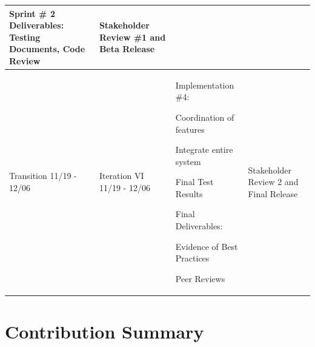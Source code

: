 \documentclass[11pt]{article}
\newenvironment{packed_itemize}{
\begin{itemize}
  \setlength{\itemsep}{1pt}
  \setlength{\parskip}{0pt}
  \setlength{\parsep}{0pt}
}{\end{itemize}}
\begin{document}
\begin{tabular}{|m{0.9in}|m{0.9in}|m{4in}|m{.8in}|}
Sprint \# 2 Deliverables:
 Testing Documents, Code Review &
Stakeholder Review \#1
and
Beta Release \\ \hline
Transition  11/19 - 12/06 &
Iteration VI 11/19 - 12/06 & \vspace{0.1in}
Implementation \#4:
	\begin{packed_itemize}
		\vspace{-0.15in}
		\item Coordination of features
		\item Integrate entire system
	\end{packed_itemize}
Final Test Results

Final Deliverables:
	\begin{packed_itemize}
	\vspace{-0.15in}
		\item Evidence of Best Practices
		\item Peer Reviews
	\vspace{-0.15in}
	\end{packed_itemize}
&
Stakeholder Review 2 and Final Release \\
\hline
\end{tabular}


\section{Contribution Summary}
\end{document}
